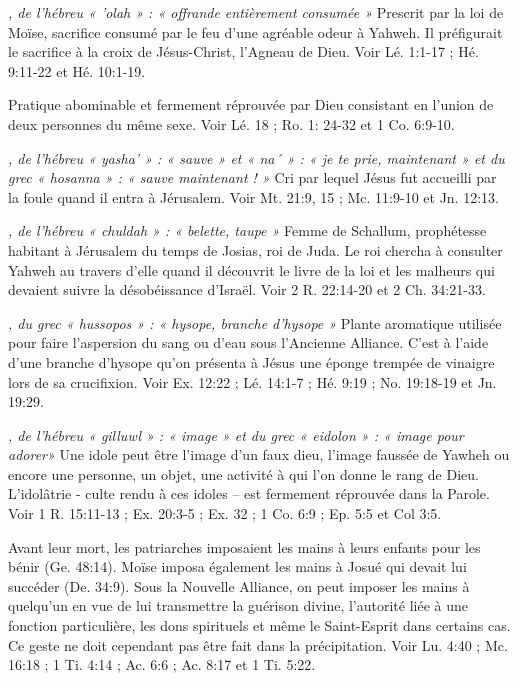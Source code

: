 \begin{multicols}{2}
{\textit{, de l'hébreu « 'olah » : « offrande entièrement consumée »}\newline
Prescrit par la loi de Moïse, sacrifice consumé par le feu d'une agréable odeur à Yahweh. Il préfigurait le sacrifice à la croix de Jésus-Christ, l'Agneau de Dieu. Voir Lé. 1:1-17 ; Hé. 9:11-22 et Hé. 10:1-19.

\textit{}\newline
Pratique abominable et fermement réprouvée par Dieu consistant en l'union de deux personnes du même sexe. Voir Lé. 18 ; Ro. 1: 24-32 et 1 Co. 6:9-10.

\textit{, de l'hébreu « yasha' » : « sauve » et « na´ » : « je te prie, maintenant » et du grec « hosanna » : « sauve maintenant ! »}\newline
Cri par lequel Jésus fut accueilli par la foule quand il entra à Jérusalem. Voir Mt. 21:9, 15 ; Mc. 11:9-10 et Jn. 12:13.

\textit{, de l'hébreu « chuldah » : « belette, taupe »}\newline
Femme de Schallum, prophétesse habitant à Jérusalem du temps de Josias, roi de Juda. Le roi chercha à consulter Yahweh au travers d'elle quand il découvrit le livre de la loi et les malheurs qui devaient suivre la désobéissance d'Israël. Voir 2 R. 22:14-20 et 2 Ch. 34:21-33.

\textit{, du grec « hussopos » : « hysope, branche d'hysope »}\newline
Plante aromatique utilisée pour faire l'aspersion du sang ou d'eau sous l'Ancienne Alliance. C'est à l'aide d'une branche d'hysope qu'on présenta à Jésus une éponge trempée de vinaigre lors de sa crucifixion. Voir Ex. 12:22 ; Lé. 14:1-7 ; Hé. 9:19 ; No. 19:18-19 et Jn. 19:29.

\textit{, de l'hébreu « gilluwl » : « image » et du grec « eidolon » : « image pour adorer»}\newline
Une idole peut être l'image d'un faux dieu, l'image faussée de Yawheh ou encore une personne, un objet, une activité à qui l'on donne le rang de Dieu. L'idolâtrie - culte rendu à ces idoles – est fermement réprouvée dans la Parole. Voir 1 R. 15:11-13 ; Ex. 20:3-5 ; Ex. 32 ; 1 Co. 6:9 ; Ep. 5:5 et Col 3:5.

\textit{}\newline
Avant leur mort, les patriarches imposaient les mains à leurs enfants pour les bénir (Ge. 48:14). Moïse imposa également les mains à Josué qui devait lui succéder (De. 34:9). Sous la Nouvelle Alliance, on peut imposer les mains à quelqu'un en vue de lui transmettre la guérison divine, l'autorité liée à une fonction particulière, les dons spirituels et même le Saint-Esprit dans certains cas. Ce geste ne doit cependant pas être fait dans la précipitation. Voir Lu. 4:40 ; Mc. 16:18 ; 1 Ti. 4:14 ; Ac. 6:6 ; Ac. 8:17 et 1 Ti. 5:22.

}
\end{multicols}
